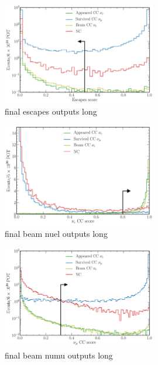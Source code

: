 \begin{figure} %
    \includegraphics[width=0.6\textwidth]{diagrams/7-cvn/chipsnet/final_escapes_outputs.pdf}
    \caption[final escapes outputs short]
    {final escapes outputs long}
    \label{fig:final_escapes_outputs}
\end{figure}

\begin{figure} %
    \includegraphics[width=0.6\textwidth]{diagrams/7-cvn/chipsnet/final_beam_nuel_outputs.pdf}
    \caption[final beam nuel outputs short]
    {final beam nuel outputs long}
    \label{fig:final_beam_nuel_outputs}
\end{figure}

\begin{figure} %
    \includegraphics[width=0.6\textwidth]{diagrams/7-cvn/chipsnet/final_beam_numu_outputs.pdf}
    \caption[final beam numu outputs short]
    {final beam numu outputs long}
    \label{fig:final_beam_numu_outputs}
\end{figure}

